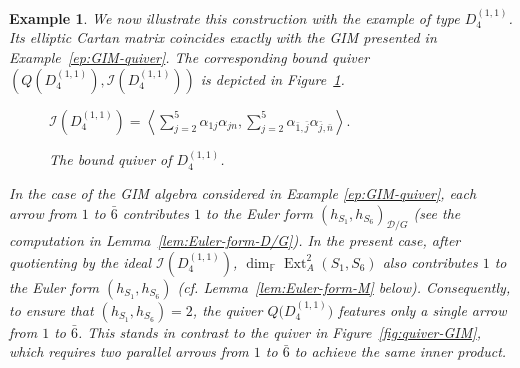 \documentclass[12pt,reqno]{amsart}
\numberwithin{equation}{section}
\newcommand{\Ext}{\operatorname{Ext}\nolimits}
\renewcommand{\dim}{\operatorname{dim}\nolimits}
\newtheorem{example}[theorem]{Example}
\begin{document}
	\begin{example}\label{ep:D_4-quiver}
		We now illustrate this construction with the example of type $D_4^{(1,1)}$. Its elliptic Cartan matrix
		coincides exactly with the GIM presented in Example~\ref{ep:GIM-quiver}. The
		corresponding bound quiver $(Q(D_4^{(1,1)}),\mathcal{I}(D_4^{(1,1)}))$ is depicted in Figure~\ref{fig:quiver-D4}.
		\begin{figure}
			\centering
			$\mathcal{I}(D_4^{(1,1)})
			=
			\left\langle
			\sum_{j=2}^5\alpha_{1j}\alpha_{j n},
			\sum_{j=2}^5\alpha_{\bar 1,\bar j}\alpha_{\bar j,\bar n}
			\right\rangle .$
			\caption{The bound quiver of $D_4^{(1,1)}$.}
			\label{fig:quiver-D4}
		\end{figure}
		
		
		In the case of the GIM algebra considered
		in Example \ref{ep:GIM-quiver}, each arrow from $1$ to $\bar 6$ contributes $1$ to the Euler form
		$(h_{S_1},h_{S_6})_{\mathcal{D}/G}$ (see the computation in
		Lemma~\ref{lem:Euler-form-D/G}). In the present case, after quotienting by
		the ideal $\mathcal{I}(D_4^{(1,1)})$, $\dim_{\mathbb{F}}\Ext^2_{A}(S_1,S_6)$ also contributes $1$ to the Euler form $(h_{S_1},h_{S_6})$ (cf. Lemma~\ref{lem:Euler-form-M} below). Consequently, to ensure that
		$(h_{S_1},h_{S_6})=2$, the quiver $Q\bigl(D_4^{(1,1)}\bigr)$ features only a single arrow from $1$ to $\bar{6}$. This stands in contrast to the quiver in Figure~\ref{fig:quiver-GIM}, which requires two parallel arrows from $1$ to $\bar{6}$ to achieve the same inner product.
		
		
		
	\end{example}
	
\end{document}
